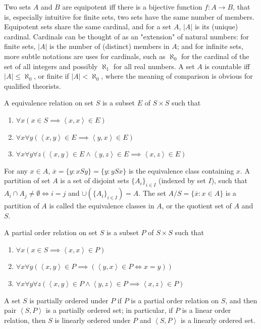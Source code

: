 \documentclass{book}
\theoremstyle{definition}\newtheorem{mechanism}{Mechanism}
\theoremstyle{remark}\newtheorem*{remark}{Remark}
\begin{document}
Two sets $A$ and $B$ are equipotent iff there is a bijective function $f: A\to B$, that is, especially intuitive for finite sets, two sets have the same number of members. Equipotent sets share the same cardinal, and for a set $A$, $|A|$ is its (unique) cardinal. Cardinals can be thought of as an "extension" of natural numbers: for finite sets, $|A|$ is the number of (distinct) members in $A$; and for infinite sets, more subtle notations are uses for cardinals, such as $\aleph_0$ for the cardinal of the set of all integers and possibly $\aleph_1$ for all real numbers. A set $A$ is countable iff $|A|\le \aleph_0$, or finite if $|A|<\aleph_0$, where the meaning of comparison is obvious for qualified theorists. 

A equivalence relation on set $S$ is a subset $E$ of $S\times S$ such that

\begin{enumerate}
	\item $\forall x(x\in S\implies \left<x, x\right>\in E)$
	\item $\forall x\forall y(\left<x, y\right>\in E\implies \left<y, x\right>\in E)$
	\item $\forall x\forall y \forall z(\left<x, y\right>\in E\land\left<y, z\right>\in E\implies \left<x, z\right>\in E)$
\end{enumerate}

For any $x\in A$, $\overline{x} = \{y: xSy\} = \{y: ySx\}$ is the equivalence class containing $x$. A partition of set $A$ is a set of disjoint sets $\{A_i\}_{i\in I}$ (indexed by set $I$), such that $A_i\cap A_j \ne \emptyset \iff i = j$ and $\cup(\{A_i\}_{i\in I}) = A$. The set $A/S = \{\overline{x}: x\in A\}$ is a partition of $A$ is called the equivalence classes in $A$, or the quotient set of $A$ and $S$.

A partial order relation on set $S$ is a subset $P$ of $S\times S$ such that

\begin{enumerate}
	\item $\forall x(x\in S\implies \left<x, x\right>\in P)$
	\item $\forall x\forall y(\left<x, y\right>\in P\implies (\left<y, x\right>\in P\iff x = y))$
	\item $\forall x\forall y \forall z(\left<x, y\right>\in P\land\left<y, z\right>\in P\implies \left<x, z\right>\in P)$
\end{enumerate}

A set $S$ is partially ordered under $P$ if $P$ is a partial order relation on $S$, and then pair $\left<S, P\right>$ is a partially ordered set; in particular, if $P$ is a linear order relation, then $S$ is linearly ordered under $P$ and $\left<S, P\right>$ is a linearly ordered set. 
\end{document}
